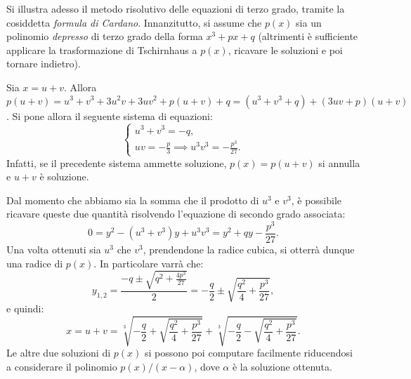 \documentclass[12pt]{scrartcl}
\begin{document}
	
	Si illustra adesso il metodo risolutivo delle equazioni di terzo grado,
	tramite la cosiddetta \textit{formula di Cardano}. Innanzitutto, si
	assume che $p(x)$ sia un polinomio \textit{depresso} di terzo grado
	della forma $x^3 + px + q$ (altrimenti è sufficiente applicare la
	trasformazione di Tschirnhaus a $p(x)$, ricavare le soluzioni e poi
	tornare indietro). \medskip
	
	
	Sia $x = u + v$. Allora $p(u + v) = u^3 + v^3 + 3 u^2 v + 3 u v^2 + p(u + v) + q =
	(u^3 + v^3 + q) + (3uv + p)(u + v)$. Si pone allora il seguente sistema di
	equazioni:
	\[ \begin{cases}
		u^3 + v^3 = -q, \\
		uv = -\frac{p}{3} \implies u^3 v^3 = - \frac{p^3}{27}.
	\end{cases} \]
	Infatti, se il precedente sistema ammette soluzione, $p(x) = p(u + v)$ si annulla e
	$u + v$ è soluzione. \medskip
	
	
	Dal momento che abbiamo sia la somma che il prodotto di $u^3$ e $v^3$, è possibile
	ricavare queste due quantità risolvendo l'equazione di secondo grado
	associata:
	\[ 0 = y^2 - (u^3 + v^3) y + u^3 v^3 = y^2 + q y - \frac{p^3}{27}. \]
	Una volta ottenuti sia $u^3$ che $v^3$, prendendone la radice cubica, si
	otterrà dunque una radice di $p(x)$. In particolare varrà che:
	\[ y_{1,2} = \frac{-q \pm \sqrt{q^2 + \frac{4p^3}{27}}}{2} = -\frac{q}{2} \pm \sqrt{\frac{q^2}{4} + \frac{p^3}{27}}, \]
	e quindi:
	\[ x = u + v = \sqrt[3]{-\frac{q}{2} + \sqrt{\frac{q^2}{4} + \frac{p^3}{27}}} + \sqrt[3]{-\frac{q}{2} - \sqrt{\frac{q^2}{4} + \frac{p^3}{27}}}. \]
	Le altre due soluzioni di $p(x)$ si possono poi computare facilmente riducendosi
	a considerare il polinomio $p(x) / (x-\alpha)$, dove $\alpha$ è la soluzione
	ottenuta.
\end{document}
